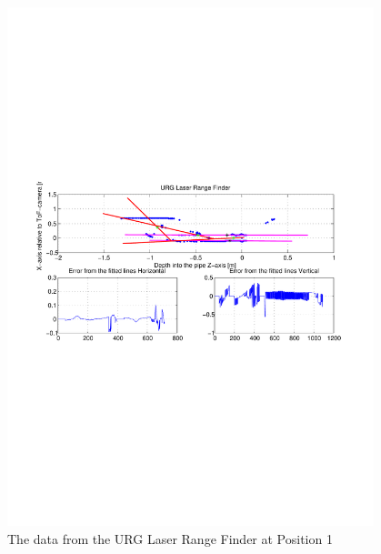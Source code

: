 \begin{figure}[htbp]
    \centering
    \includegraphics[width=0.95\textwidth]{pics/pos1-regular-urg-2d}
    \caption{The data from the URG Laser Range Finder at Position 1}
    \label{chap7:fig-pos1-regular-urg-2d}
\end{figure}

